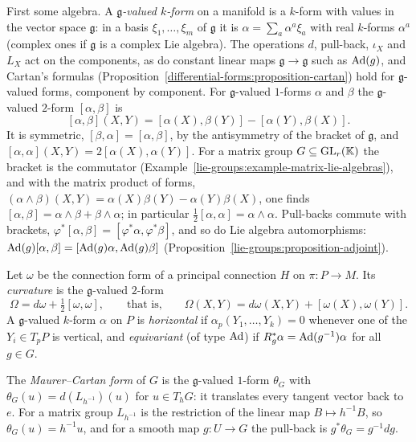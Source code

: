 First some algebra. A \emph{$\mathfrak{g}$-valued $k$-form} on a manifold is a $k$-form with values in the vector space $\mathfrak{g}$: in a basis $\xi_1, \ldots, \xi_m$ of $\mathfrak{g}$ it is
$\alpha = \sum_a\alpha^a\xi_a$ with real $k$-forms $\alpha^a$ (complex ones if $\mathfrak{g}$ is a complex Lie algebra). The operations $d$, pull-back, $\iota_X$ and $L_X$ act on the components, as do constant linear maps
$\mathfrak{g} \to \mathfrak{g}$ such as $\operatorname{Ad}(g)$, and Cartan's formulas (Proposition~\ref{differential-forms:proposition-cartan}) hold for $\mathfrak{g}$-valued forms, component by component. For
$\mathfrak{g}$-valued $1$-forms $\alpha$ and $\beta$ the $\mathfrak{g}$-valued $2$-form $[\alpha, \beta]$ is
\[
[\alpha, \beta](X, Y) = [\alpha(X), \beta(Y)] - [\alpha(Y), \beta(X)] .
\]
It is symmetric, $[\beta, \alpha] = [\alpha, \beta]$, by the antisymmetry of the bracket of $\mathfrak{g}$, and $[\alpha, \alpha](X, Y) = 2[\alpha(X), \alpha(Y)]$. For a matrix group
$G \subseteq \mathrm{GL}_r(\mathbb{K})$ the bracket is the commutator (Example~\ref{lie-groups:example-matrix-lie-algebras}), and with the matrix product of forms,
$(\alpha \wedge \beta)(X, Y) = \alpha(X)\beta(Y) - \alpha(Y)\beta(X)$, one finds $[\alpha, \beta] = \alpha \wedge \beta + \beta \wedge \alpha$; in particular $\frac12[\alpha, \alpha] = \alpha \wedge \alpha$.
Pull-backs commute with brackets, $\varphi^*[\alpha, \beta] = [\varphi^*\alpha, \varphi^*\beta]$, and so do Lie algebra automorphisms: $\operatorname{Ad}(g)[\alpha, \beta] = [\operatorname{Ad}(g)\alpha, \operatorname{Ad}(g)\beta]$
(Proposition~\ref{lie-groups:proposition-adjoint}).

\begin{definition}\label{connections:definition-principal-curvature}
Let $\omega$ be the connection form of a principal connection $H$ on $\pi \colon P \to M$. Its \emph{curvature} is the $\mathfrak{g}$-valued $2$-form
\[
\Omega = d\omega + \tfrac12[\omega, \omega], \qquad \text{that is,} \qquad \Omega(X, Y) = d\omega(X, Y) + [\omega(X), \omega(Y)] .
\]
A $\mathfrak{g}$-valued $k$-form $\alpha$ on $P$ is \emph{horizontal} if $\alpha_p(Y_1, \ldots, Y_k) = 0$ whenever one of the $Y_i \in T_pP$ is vertical, and \emph{equivariant} (of type $\operatorname{Ad}$) if
$R_g^*\alpha = \operatorname{Ad}(g^{-1})\alpha$ for all $g \in G$.
\end{definition}

The \emph{Maurer--Cartan form} of $G$ is the $\mathfrak{g}$-valued $1$-form $\theta_G$ with $\theta_G(u) = d(L_{h^{-1}})(u)$ for $u \in T_hG$: it translates every tangent vector back to $e$. For a matrix
group $L_{h^{-1}}$ is the restriction of the linear map $B \mapsto h^{-1}B$, so $\theta_G(u) = h^{-1}u$, and for a smooth map $g \colon U \to G$ the pull-back is $g^*\theta_G = g^{-1}dg$.

